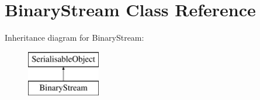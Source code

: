 \hypertarget{classBinaryStream}{\section{Binary\-Stream Class Reference}
\label{classBinaryStream}
}
Inheritance diagram for Binary\-Stream\-:\begin{figure}[H]
\begin{center}
\leavevmode
\includegraphics[height=2.000000cm]{classBinaryStream}
\end{center}
\end{figure}
